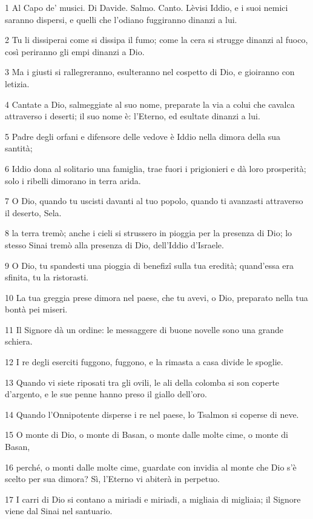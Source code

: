 \par 1 Al Capo de' musici. Di Davide. Salmo. Canto. Lèvisi Iddio, e i suoi nemici saranno dispersi, e quelli che l'odiano fuggiranno dinanzi a lui.
\par 2 Tu li dissiperai come si dissipa il fumo; come la cera si strugge dinanzi al fuoco, così periranno gli empi dinanzi a Dio.
\par 3 Ma i giusti si rallegreranno, esulteranno nel cospetto di Dio, e gioiranno con letizia.
\par 4 Cantate a Dio, salmeggiate al suo nome, preparate la via a colui che cavalca attraverso i deserti; il suo nome è: l'Eterno, ed esultate dinanzi a lui.
\par 5 Padre degli orfani e difensore delle vedove è Iddio nella dimora della sua santità;
\par 6 Iddio dona al solitario una famiglia, trae fuori i prigionieri e dà loro prosperità; solo i ribelli dimorano in terra arida.
\par 7 O Dio, quando tu uscisti davanti al tuo popolo, quando ti avanzasti attraverso il deserto, Sela.
\par 8 la terra tremò; anche i cieli si strussero in pioggia per la presenza di Dio; lo stesso Sinai tremò alla presenza di Dio, dell'Iddio d'Israele.
\par 9 O Dio, tu spandesti una pioggia di benefizî sulla tua eredità; quand'essa era sfinita, tu la ristorasti.
\par 10 La tua greggia prese dimora nel paese, che tu avevi, o Dio, preparato nella tua bontà pei miseri.
\par 11 Il Signore dà un ordine: le messaggere di buone novelle sono una grande schiera.
\par 12 I re degli eserciti fuggono, fuggono, e la rimasta a casa divide le spoglie.
\par 13 Quando vi siete riposati tra gli ovili, le ali della colomba si son coperte d'argento, e le sue penne hanno preso il giallo dell'oro.
\par 14 Quando l'Onnipotente disperse i re nel paese, lo Tsalmon si coperse di neve.
\par 15 O monte di Dio, o monte di Basan, o monte dalle molte cime, o monte di Basan,
\par 16 perché, o monti dalle molte cime, guardate con invidia al monte che Dio s'è scelto per sua dimora? Sì, l'Eterno vi abiterà in perpetuo.
\par 17 I carri di Dio si contano a miriadi e miriadi, a migliaia di migliaia; il Signore viene dal Sinai nel santuario.
